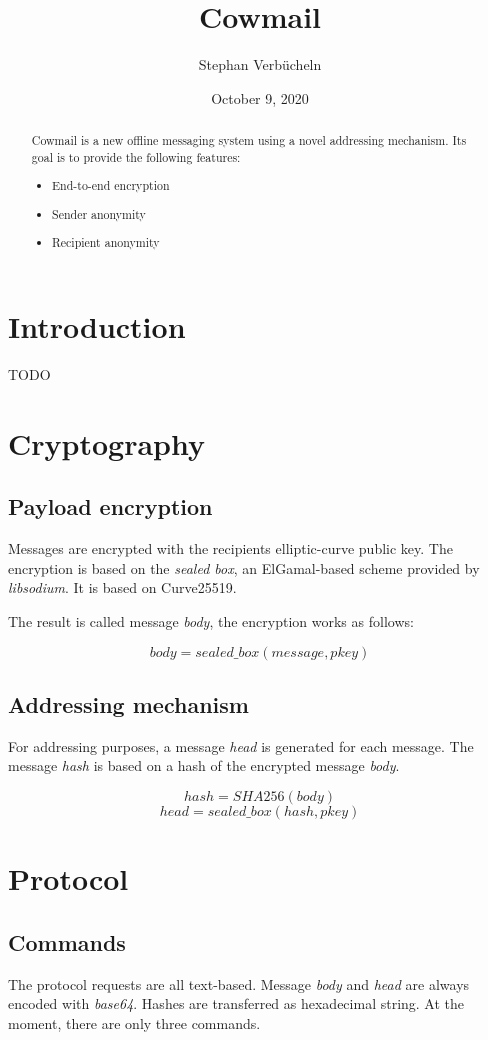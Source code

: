 \documentclass[a4paper]{article}
\title{Cowmail}
\author{Stephan Verbücheln}
\date{October 9, 2020}
\begin{document}
\maketitle


\begin{abstract}
Cowmail is a new offline messaging system using a novel addressing mechanism. Its
goal is to provide the following features:
\begin{itemize}
\item End-to-end encryption
\item Sender anonymity
\item Recipient anonymity
\end{itemize}
\end{abstract}

\section{Introduction}
TODO

\section{Cryptography}
\subsection{Payload encryption}
Messages are encrypted with the recipients elliptic-curve public key. The
encryption is based on the \textit{sealed box}, an ElGamal-based scheme provided
by \textit{libsodium}. It is based on Curve25519\cite{eddsa}.

The result is called message \textit{body}, the encryption works as follows:

$$
body = sealed\_box(message, pkey)
$$

\subsection{Addressing mechanism}
For addressing purposes, a message \textit{head} is generated for each message.
The message \textit{hash} is based on a hash of the encrypted message \textit{body}.

$$
hash = SHA256(body)
$$
$$
head = sealed\_box(hash, pkey)
$$

\section{Protocol}

\subsection{Commands}
The protocol requests are all text-based. Message \textit{body} and
\textit{head} are always encoded with \textit{base64}. Hashes are transferred as
hexadecimal string. At the moment, there are only three commands.
\end{document}
